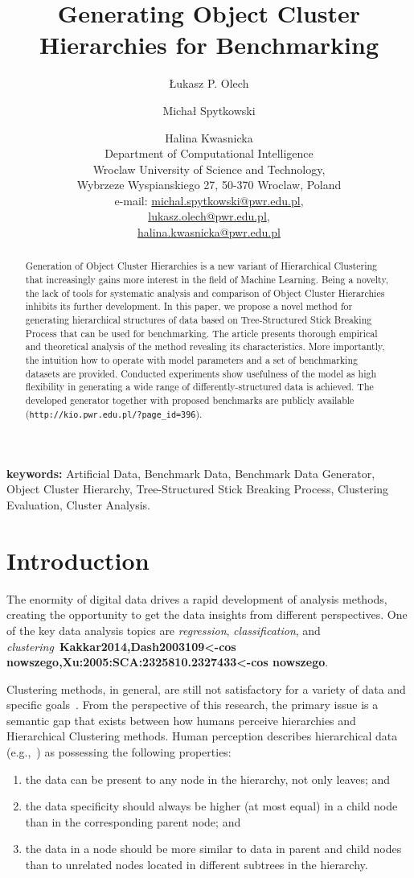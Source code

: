 \documentclass{article}
\title{Generating Object Cluster Hierarchies for Benchmarking}
\author{\L{}ukasz P. Olech \and Micha\l{} Spytkowski \and Halina Kwasnicka \\ Department of Computational Intelligence\\ Wroclaw University of Science and Technology, \\ Wybrzeze Wyspianskiego 27, 50-370 Wroclaw, Poland\\ e-mail: \url{michal.spytkowski@pwr.edu.pl}, \\ \url{lukasz.olech@pwr.edu.pl}, \\ \url{halina.kwasnicka@pwr.edu.pl}}
\begin{document}
\maketitle

\begin{abstract}
	Generation of Object Cluster Hierarchies is a new variant of Hierarchical Clustering that increasingly gains more interest in the field of Machine Learning. Being a novelty, the lack of tools for systematic analysis and comparison of Object Cluster Hierarchies inhibits its further development. In this paper, we propose a novel method for generating hierarchical structures of data based on Tree-Structured Stick Breaking Process that can be used for benchmarking. The article presents thorough empirical and theoretical analysis of the method revealing its characteristics. More importantly, the intuition how to operate with model parameters and a set of benchmarking datasets are provided. Conducted experiments show usefulness of the model as high flexibility in generating a wide range of differently-structured data is achieved. The developed generator together with proposed benchmarks are publicly available (\texttt{http://kio.pwr.edu.pl/?page\_id=396}).
\end{abstract}

\textbf{keywords:} Artificial Data, Benchmark Data, Benchmark Data Generator, Object Cluster Hierarchy, Tree-Structured Stick Breaking Process, Clustering Evaluation, Cluster Analysis.

\section{Introduction}
\label{sec:intro}
The enormity of digital data drives a rapid development of analysis methods, creating the opportunity to get the data insights from different perspectives. One of the key data analysis topics are \textit{regression}, \textit{classification}, and \textit{clustering}~\textbf{Kakkar2014,Dash2003109<-cos nowszego,Xu:2005:SCA:2325810.2327433<-cos nowszego}.

Clustering methods, in general, are still not satisfactory for a variety of data and specific goals~\cite{blundell2010discovering}. From the perspective of this research, the primary issue is a semantic gap that exists between how humans perceive hierarchies and Hierarchical Clustering methods. Human perception describes hierarchical data (e.g.,~\cite{ILSVRC15}) as possessing the following properties:
\begin{enumerate}
    \item the data can be present to any node in the hierarchy, not only leaves; and
    \item the data specificity should always be higher (at most equal) in a child node than in the corresponding parent node; and
    \item the data in a node should be more similar to data in parent and child nodes than to unrelated nodes located in different subtrees in the hierarchy.
\end{enumerate}
\end{document}
